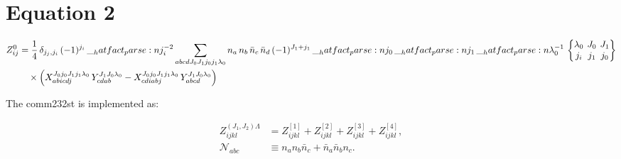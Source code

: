 \documentclass{scrartcl}
\newcommand{\sixj}[6]{\begingroup\setlength{\arraycolsep}{0.2em}\begin{Bmatrix} #1 & #2 & #3 \\ #4 & #5 & #6 \end{Bmatrix}\endgroup}
\begin{document}
\section{Equation 2}
\begin{dmath*}
\begin{aligned}
Z_{i j}^{0}
&= \frac{1}{4}\,\delta_{{j}_{j},{j}_{i}} \, (-1)^{{j}_{i}} \, \hatfact{{j}_{i}^{-2}}
\sum_{a b c d {J}_{0} {J}_{1} {j}_{0} {j}_{1} {{\lambda}}_{0}}
n_{a} \, n_{b} \, \bar{n}_{c} \, \bar{n}_{d}
\, (-1)^{{J}_{1}+{j}_{1}} \, \hatfact{{j}_{0}} \, \hatfact{{j}_{1}} \, \hatfact{{{\lambda}}_{0}^{-1}}
\, \sixj{{{\lambda}}_{0}}{{J}_{0}}{{J}_{1}}{{j}_{i}}{{j}_{1}}{{j}_{0}}
\\
&\quad\times
\Big(
X_{a b i c d j}^{{J}_{0} {j}_{0} {J}_{1} {j}_{1} {{\lambda}}_{0}} \, Y_{c d a b}^{{J}_{1} {J}_{0} {{\lambda}}_{0}}
-
X_{c d i a b j}^{{J}_{0} {j}_{0} {J}_{1} {j}_{1} {{\lambda}}_{0}} \, Y_{a b c d}^{{J}_{1} {J}_{0} {{\lambda}}_{0}}
\Big)
\end{aligned}
\end{dmath*}


The comm232st is implemented as:

\begin{align}
Z_{ijkl}^{(J_1,J_2)\Lambda}
&= Z_{ijkl}^{[1]} + Z_{ijkl}^{[2]} + Z_{ijkl}^{[3]} + Z_{ijkl}^{[4]},\\[0.5em]
\mathcal{N}_{abc}
&\equiv n_a n_b \bar n_c + \bar n_a \bar n_b n_c .
\end{align}
\end{document}
